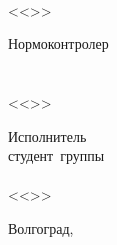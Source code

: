 {{\begin{flushright}
\begin{minipage}[c]{15em}
\makebox[2cm]{\hrulefill}\VSTUDirectorName\\
<<\makebox[1.5cm]{\hrulefill}>>\makebox[3.5cm]{\hrulefill}\the\year
\end{minipage}
\end{flushright}
\vspace{8mm}
\begin{flushleft}
\begin{minipage}[c]{15em}
Нормоконтролер\\
\VSTUStandardsAdviserDegree\\
\makebox[2cm]{\hrulefill}\VSTUStandardsAdviserName\\
<<\makebox[1.5cm]{\hrulefill}>>\makebox[3.5cm]{\hrulefill}\the\year
\end{minipage}
\hfill
\begin{minipage}[c]{15em}
Исполнитель\\
студент\ группы\ \VSTUStudentGroup\\
\makebox[2cm]{\hrulefill}\VSTUStudentName\\
<<\makebox[1.5cm]{\hrulefill}>>\makebox[3.5cm]{\hrulefill}\the\year
\end{minipage}
\end{flushleft}
\vfill
\begin{center}
Волгоград,\ \the\year
\end{center}
\newpage
}
}
